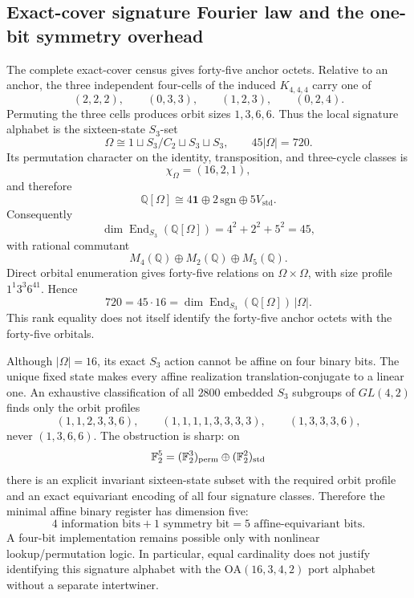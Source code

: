 \subsection{Exact-cover signature Fourier law and the one-bit symmetry overhead}
The complete exact-cover census gives forty-five anchor octets.  Relative to an anchor,
the three independent four-cells of the induced $K_{4,4,4}$ carry one of
\[
(2,2,2),\qquad(0,3,3),\qquad(1,2,3),\qquad(0,2,4).
\]
Permuting the three cells produces orbit sizes $1,3,6,6$.  Thus the local signature
alphabet is the sixteen-state $S_3$-set
\[
\Omega\cong 1\sqcup S_3/C_2\sqcup S_3\sqcup S_3,
\qquad 45|\Omega|=720.
\]
Its permutation character on the identity, transposition, and three-cycle classes is
\[
\chi_\Omega=(16,2,1),
\]
and therefore
\[
\mathbb Q[\Omega]\cong
4\mathbf 1\oplus2\,\mathrm{sgn}\oplus5V_{\mathrm{std}}.
\]
Consequently
\[
\dim\operatorname{End}_{S_3}(\mathbb Q[\Omega])
=4^2+2^2+5^2=45,
\]
with rational commutant
\[
M_4(\mathbb Q)\oplus M_2(\mathbb Q)\oplus M_5(\mathbb Q).
\]
Direct orbital enumeration gives forty-five relations on $\Omega\times\Omega$, with
size profile $1^1 3^3 6^{41}$.  Hence
\[
720=45\cdot16
=\dim\operatorname{End}_{S_3}(\mathbb Q[\Omega])\,|\Omega|.
\]
This rank equality does not itself identify the forty-five anchor octets with the
forty-five orbitals.

Although $|\Omega|=16$, its exact $S_3$ action cannot be affine on four binary bits.  The
unique fixed state makes every affine realization translation-conjugate to a linear one.
An exhaustive classification of all $2800$ embedded $S_3$ subgroups of $GL(4,2)$ finds
only the orbit profiles
\[
(1,1,2,3,3,6),\qquad
(1,1,1,1,3,3,3,3),\qquad
(1,3,3,3,6),
\]
never $(1,3,6,6)$.  The obstruction is sharp: on
\[
\mathbb F_2^5=(\mathbb F_2^3)_{\rm perm}\oplus(\mathbb F_2^2)_{\rm std}
\]
there is an explicit invariant sixteen-state subset with the required orbit profile and
an exact equivariant encoding of all four signature classes.  Therefore the minimal
affine binary register has dimension five:
\[
\boxed{4\text{ information bits}+1\text{ symmetry bit}=5\text{ affine-equivariant bits}.}
\]
A four-bit implementation remains possible only with nonlinear lookup/permutation logic.
In particular, equal cardinality does not justify identifying this signature alphabet
with the $\mathrm{OA}(16,3,4,2)$ port alphabet without a separate intertwiner.

